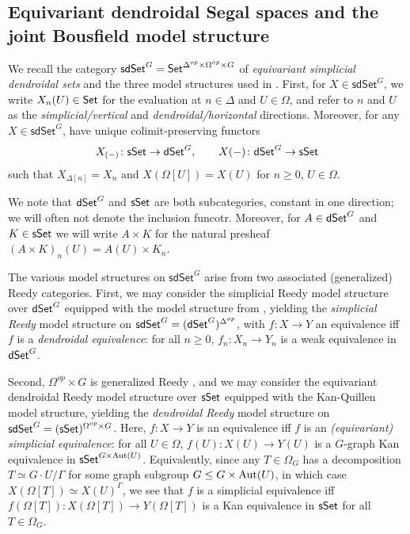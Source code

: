 \documentclass[a4paper,10pt
,draft
]{article}%
\renewcommand{\1}{\eta}%
\begin{document}












\subsection{Equivariant dendroidal Segal spaces and the joint Bousfield model structure}
\label{JT_SEC}

We recall the category $\mathsf{sdSet}^G = \mathsf{Set}^{\Delta^{op} \times \Omega^{op} \times G}$ of \textit{equivariant simplicial dendroidal sets} and the three model structures used in \cite{BP_edss}.
First, for $X \in \mathsf{sdSet}^G$, we write $X_n(U) \in \mathsf{Set}$ for the evaluation at $n \in \Delta$ and $U \in \Omega$,
and refer to $n$ and $U$ as the \textit{simplicial/vertical} and \textit{dendroidal/horizontal} directions.
Moreover, for any $X \in \mathsf{sdSet}^G$, have unique colimit-preserving functors
\begin{equation}
      \label{SDSET_EQ}
      X_{(-)} \colon \mathsf{sSet} \to \mathsf{dSet}^G,
      \qquad
      X(-) \colon \mathsf{dSet}^G \to \mathsf{sSet}
\end{equation}
such that $X_{\Delta[n]} = X_n$ and $X(\Omega[U]) = X(U)$ for $n \geq 0$, $U \in \Omega$.

We note that $\mathsf{dSet}^G$ and $\mathsf{sSet}$ are both subcategories, constant in one direction;
we will often not denote the inclusion funcotr.
Moreover, for $A \in \mathsf{dSet}^G$ and $K \in \mathsf{sSet}$ we will write $A \times K$ for the natural presheaf $(A \times K)_n(U) = A(U) \times K_n$.

The various model structures on $\mathsf{sdSet}^G$ arise from two associated (generalized) Reedy categories.
First, we may consider the simplicial Reedy model structure over $\mathsf{dSet}^G$ equipped with the model structure from \cite{Per18},
yielding the \textit{simplicial Reedy} model structure on $\mathsf{sdSet}^G = (\mathsf{dSet}^G)^{\Delta^{op}}$,
with $f \colon X \to Y$ an equivalence iff $f$ is a \textit{dendroidal equivalence}: for all $n \geq 0$, $f_n: X_n \to Y_n$ is a weak equivalence in $\mathsf{dSet}^G$.

Second, $\Omega^{op} \times G$ is generalized Reedy \cite[Example A.7]{BP_edss},
and we may consider the equivariant dendroidal Reedy model structure over $\mathsf{sSet}$ equipped with the Kan-Quillen model structure,
yielding the \textit{dendroidal Reedy} model structure on $\mathsf{sdSet}^G = (\mathsf{sSet})^{\Omega^{op} \times G}$.
Here, $f\colon X \to Y$ is an equivalence iff $f$ is an \textit{(equivariant) simplicial equivalence}:
for all $U \in \Omega$, $f(U) \colon X(U) \to Y(U)$ is a $G$-graph Kan equivalence in $\mathsf{sSet}^{G \times \operatorname{Aut}(U)}$.
Equivalently, since any $T \in \Omega_G$ has a decomposition $T \simeq G \cdot U/\Gamma$ for some graph subgroup $G \leq G \times \operatorname{Aut}(U)$,
in which case $X(\Omega[T]) \simeq X(U)^\Gamma$,
we see that $f$ is a simplicial equivalence iff $f(\Omega[T]) \colon X(\Omega[T]) \to Y(\Omega[T])$ is a Kan equivalence in $\mathsf{sSet}$ for all $T \in \Omega_G$.
\end{document}
